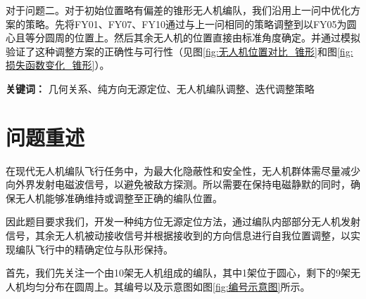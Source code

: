 \documentclass[12pt,AutoFakeSlant,AutoFakeBold]{article}
\begin{document}
对于问题二。对于初始位置略有偏差的锥形无人机编队，我们沿用上一问中优化方案的策略。先将FY01、FY07、FY10通过与上一问相同的策略调整到以FY05为圆心且等分圆周的位置上。然后其余无人机的位置直接由标准角度确定。并通过模拟验证了这种调整方案的正确性与可行性（见图\ref{fig:无人机位置对比_锥形}和图\ref{fig:损失函数变化_锥形}）。

\textbf{关键词：} 几何关系、纯方向无源定位、无人机编队调整、迭代调整策略

\newpage


\section{问题重述}

在现代无人机编队飞行任务中，为最大化隐蔽性和安全性，无人机群体需尽量减少向外界发射电磁波信号，以避免被敌方探测。所以需要在保持电磁静默的同时，确保无人机能够准确维持或调整至正确的编队位置。

因此题目要求我们，开发一种纯方位无源定位方法，通过编队内部部分无人机发射信号，其余无人机被动接收信号并根据接收到的方向信息进行自我位置调整，以实现编队飞行中的精确定位与队形保持。

首先，我们先关注一个由10架无人机组成的编队，其中1架位于圆心，剩下的9架无人机均匀分布在圆周上。其编号以及示意图如图\ref{fig:编号示意图}所示。
\end{document}
